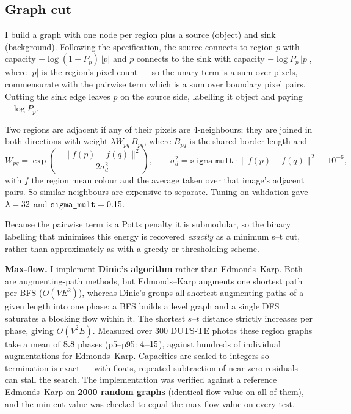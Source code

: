 \documentclass[11pt,a4paper]{article}
\begin{document}
\subsection{Graph cut}
I build a graph with one node per region plus a source (object) and sink (background).
Following the specification, the source connects to region $p$ with capacity
$-\log(1-P_p)\,|p|$ and $p$ connects to the sink with capacity $-\log P_p\,|p|$, where
$|p|$ is the region's pixel count --- so the unary term is a sum over pixels,
commensurate with the pairwise term which is a sum over boundary pixel pairs. Cutting
the sink edge leaves $p$ on the source side, labelling it object and paying $-\log P_p$.

Two regions are adjacent if any of their pixels are 4-neighbours; they are joined in
both directions with weight $\lambda W_{pq}\,B_{pq}$, where $B_{pq}$ is the shared
border length and
\[
W_{pq}=\exp\!\left(-\frac{\lVert f(p)-f(q)\rVert^2}{2\sigma_d^2}\right),\qquad
\sigma_d^2 = \texttt{sigma\_mult}\cdot\overline{\lVert f(p)-f(q)\rVert^2} + 10^{-6},
\]
with $f$ the region mean colour and the average taken over that image's adjacent pairs.
So similar neighbours are expensive to separate. Tuning on validation gave
$\lambda=32$ and $\texttt{sigma\_mult}=0.15$.

Because the pairwise term is a Potts penalty it is submodular, so the binary labelling
that minimises this energy is recovered \emph{exactly} as a minimum s--t cut, rather
than approximately as with a greedy or thresholding scheme.

\textbf{Max-flow.} I implement \textbf{Dinic's algorithm} rather than Edmonds--Karp.
Both are augmenting-path methods, but Edmonds--Karp augments one shortest path per BFS
($O(VE^2)$), whereas Dinic's groups all shortest augmenting paths of a given length
into one phase: a BFS builds a level graph and a single DFS saturates a blocking flow
within it. The shortest $s$--$t$ distance strictly increases per phase, giving
$O(V^2E)$. Measured over 300 DUTS-TE photos these region graphs take a mean of
$8.8$ phases (p5--p95: $4$--$15$), against hundreds of
individual augmentations for Edmonds--Karp. Capacities are scaled to integers so
termination is exact ---
with floats, repeated subtraction of near-zero residuals can stall the search.
The implementation was verified against a reference Edmonds--Karp on \textbf{2000
random graphs} (identical flow value on all of them), and the min-cut value was checked
to equal the max-flow value on every test.
\end{document}
